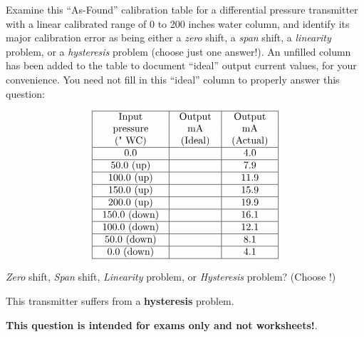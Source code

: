 

Examine this ``As-Found'' calibration table for a differential pressure transmitter with a linear calibrated range of 0 to 200 inches water column, and identify its major calibration error as being either a {\it zero} shift, a {\it span} shift, a {\it linearity} problem, or a {\it hysteresis} problem (choose just one answer!).  An unfilled column has been added to the table to document ``ideal'' output current values, for your convenience.  You need not fill in this ``ideal'' column to properly answer this question:


$$\vbox{\offinterlineskip
\halign{\strut
\vrule \quad\hfil # \ \hfil & 
\vrule \quad\hfil # \ \hfil & 
\vrule \quad\hfil # \ \hfil \vrule \cr
\noalign{\hrule}
%
Input & Output & Output \cr
%
pressure & mA & mA \cr
%
(" WC) & (Ideal) & (Actual) \cr
%
\noalign{\hrule}
%
0.0 & & 4.0 \cr
%
\noalign{\hrule}
%
50.0 (up) & & 7.9 \cr
%
\noalign{\hrule}
%
100.0 (up) & & 11.9 \cr
%
\noalign{\hrule}
%
150.0 (up) & & 15.9 \cr
%
\noalign{\hrule}
%
200.0 (up) & & 19.9 \cr
%
\noalign{\hrule}
%
150.0 (down) & & 16.1 \cr
%
\noalign{\hrule}
%
100.0 (down) & & 12.1 \cr
%
\noalign{\hrule}
%
50.0 (down) & & 8.1 \cr
%
\noalign{\hrule}
%
0.0 (down) & & 4.1 \cr
%
\noalign{\hrule}
} %
}$$ %

{\it Zero} shift, {\it Span} shift, {\it Linearity} problem, or {\it Hysteresis} problem?  (Choose !)







This transmitter suffers from a {\bf hysteresis} problem.







{\bf This question is intended for exams only and not worksheets!}.


